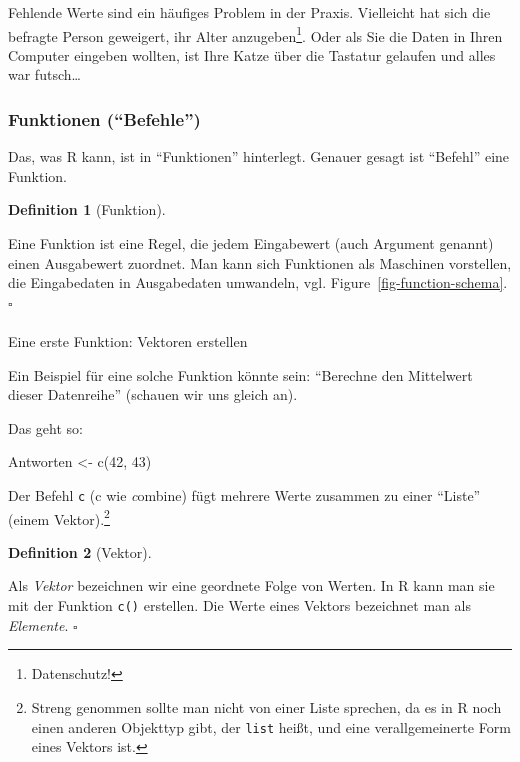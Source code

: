 \documentclass[
  letterpaper,
  DIV=11,
  numbers=noendperiod]{scrartcl}
\makeatletter
\let\oldparagraph\paragraph
\renewcommand{\paragraph}{
    \@ifstar
      \xxxParagraphStar
      \xxxParagraphNoStar
  }
\newcommand{\xxxParagraphStar}[1]{\oldparagraph*{#1}\mbox{}}
\newcommand{\xxxParagraphNoStar}[1]{\oldparagraph{#1}\mbox{}}
\newenvironment{Shaded}{\begin{snugshade}}{\end{snugshade}}
\newcommand{\DecValTok}[1]{\textcolor[rgb]{0.68,0.00,0.00}{#1}}
\newcommand{\FunctionTok}[1]{\textcolor[rgb]{0.28,0.35,0.67}{#1}}
\newcommand{\NormalTok}[1]{\textcolor[rgb]{0.00,0.23,0.31}{#1}}
\newcommand{\OtherTok}[1]{\textcolor[rgb]{0.00,0.23,0.31}{#1}}
\theoremstyle{definition}
\theoremstyle{definition}
\theoremstyle{definition}
\newtheorem{definition}{Definition}[section]
\theoremstyle{remark}
\makeatother
\begin{document}
Fehlende Werte sind ein häufiges Problem in der Praxis. Vielleicht hat
sich die befragte Person geweigert, ihr Alter anzugeben\footnote{Datenschutz!}.
Oder als Sie die Daten in Ihren Computer eingeben wollten, ist Ihre
Katze über die Tastatur gelaufen und alles war futsch\ldots{}

\subsubsection{Funktionen (``Befehle'')}\label{funktionen-befehle}

Das, was R kann, ist in ``Funktionen'' hinterlegt. Genauer gesagt ist
``Befehl'' eine Funktion.

\begin{definition}[Funktion]\protect\hypertarget{def-fun}{}\label{def-fun}

Eine Funktion ist eine Regel, die jedem Eingabewert (auch Argument
genannt) einen Ausgabewert zuordnet. Man kann sich Funktionen als
Maschinen vorstellen, die Eingabedaten in Ausgabedaten umwandeln, vgl.
Figure~\ref{fig-function-schema}. \(\square\)

\end{definition}

\paragraph{Eine erste Funktion: Vektoren
erstellen}\label{eine-erste-funktion-vektoren-erstellen}

Ein Beispiel für eine solche Funktion könnte sein: ``Berechne den
Mittelwert dieser Datenreihe'' (schauen wir uns gleich an).

Das geht so:

\begin{Shaded}
\begin{Highlighting}[]
\NormalTok{Antworten }\OtherTok{\textless{}{-}} \FunctionTok{c}\NormalTok{(}\DecValTok{42}\NormalTok{, }\DecValTok{43}\NormalTok{)}
\end{Highlighting}
\end{Shaded}

Der Befehl \texttt{c} (c wie \emph{c}ombine) fügt mehrere Werte zusammen
zu einer ``Liste'' (einem Vektor).\footnote{Streng genommen sollte man
  nicht von einer Liste sprechen, da es in R noch einen anderen
  Objekttyp gibt, der \texttt{list} heißt, und eine verallgemeinerte
  Form eines Vektors ist.}

\begin{definition}[Vektor]\protect\hypertarget{def-vektor}{}\label{def-vektor}

Als \emph{Vektor} bezeichnen wir eine geordnete Folge von Werten. In R
kann man sie mit der Funktion \texttt{c()} erstellen. Die Werte eines
Vektors bezeichnet man als \emph{Elemente}. \(\square\)

\end{definition}
\end{document}
